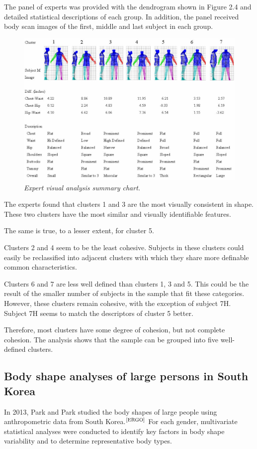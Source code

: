 \documentclass[12pt,a4paper,openany,UKenglish]{scrreprt}
\newcommand{\bib}[1]{$^\text{\cite{#1}}$}
\begin{document}
The panel of experts was provided with the dendrogram shown in Figure 2.4 and detailed statistical descriptions of each group.
In addition, the panel received body scan images of  the first, middle and last subject in each group.
\begin{figure}[H]
	\centering
	\caption{\centering\itshape Expert visual analysis summary chart.}
	\includegraphics[width=0.95\linewidth]{../Images/Cottle2.jpg}
\end{figure}

The experts found that clusters 1 and 3 are the most visually consistent in shape.
These two clusters have the most similar and visually identifiable features.

The same is true, to a lesser extent, for cluster 5.

Clusters 2 and 4 seem to be the least cohesive.
Subjects in these clusters could easily be reclassified into adjacent clusters with which they share more definable common characteristics.

Clusters 6 and 7 are less well defined than clusters 1, 3 and 5.
This could be the result of the smaller number of subjects in the sample that fit these categories.
However, these clusters remain cohesive, with the exception of subject 7H.
Subject 7H seems to match the descriptors of cluster 5 better.

Therefore, most clusters have some degree of cohesion, but not complete cohesion.
The analysis shows that the sample can be grouped into five well-defined clusters.

\subsection{Body shape analyses of large persons in South Korea}
In 2013, Park and Park studied the body shapes of large people using anthropometric data from South Korea.\bib{ERGO}
For each gender, multivariate statistical analyses were conducted to identify key factors in body shape variability and to determine representative body types.
\end{document}
